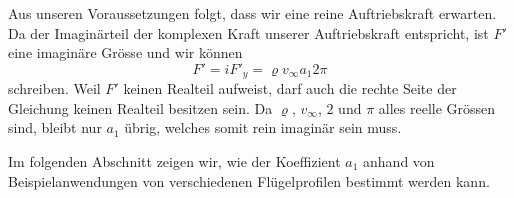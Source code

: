 Aus unseren Voraussetzungen folgt, dass wir eine reine Auftriebskraft erwarten.
Da der Imaginärteil der komplexen Kraft unserer Auftriebskraft entspricht,
ist $F'$ eine imaginäre Grösse und wir können
\[
	F'
	=
	i F'_y
	=
	\varrho v_\infty a_1 2 \pi
\]
schreiben.
Weil $F'$ keinen Realteil aufweist, darf auch die rechte Seite der Gleichung keinen Realteil besitzen sein.
Da $\varrho$, $v_\infty$, $2$ und $\pi$ alles reelle Grössen sind,
bleibt nur $a_1$ übrig, welches somit rein imaginär sein muss.

Im folgenden Abschnitt zeigen wir, wie der Koeffizient $a_1$ anhand von Beispielanwendungen von verschiedenen Flügelprofilen bestimmt werden kann.
